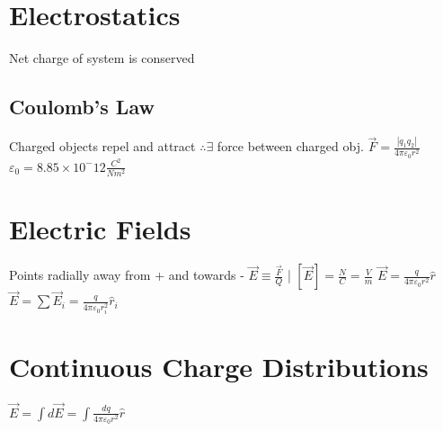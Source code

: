 \section*{Electrostatics}
Net charge of system is conserved

\subsection*{Coulomb's Law}
Charged objects repel and attract $\therefore \exists$ force between charged obj. $\vec{F} = \frac{|q_1 q_2|}{4\pi \varepsilon_0 r^2}$\\
$\varepsilon_0 = 8.85 \times 10^-12 \frac{C^2}{Nm^2}$

\section*{Electric Fields}
Points radially away from + and towards -
$\vec{E} \equiv \frac{\vec{F}}{Q}$ | $[\vec{E}] = \frac{N}{C} = \frac{V}{m}$
$\vec{E} = \frac{q}{4\pi\varepsilon_0 r^2}\hat{r}$
$\vec{E} = \sum\vec{E}_i = \frac{q}{4\pi\varepsilon_0 r_i^2}\hat{r}_i$

\section*{Continuous Charge Distributions}
$\vec{E} = \int d\vec{E} = \int \frac{dq}{4\pi\varepsilon_0 r^2}\hat{r}$


